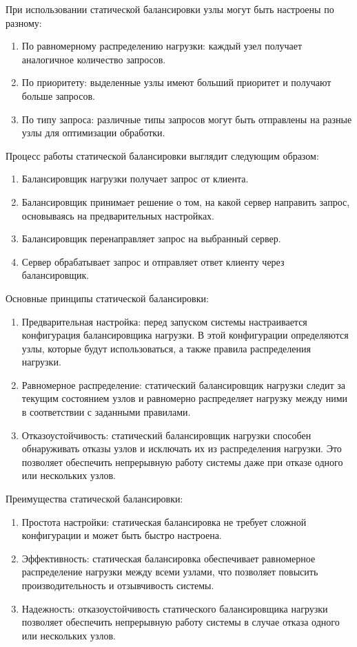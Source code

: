 При использовании статической балансировки узлы могут быть настроены по разному:
\begin{enumerate}[label=---]
	\item По равномерному распределению нагрузки: каждый узел получает аналогичное количество запросов.
	\item По приоритету: выделенные узлы имеют больший приоритет и получают больше запросов.
	\item По типу запроса: различные типы запросов могут быть отправлены на разные узлы для оптимизации обработки.
\end{enumerate}

Процесс работы статической балансировки выглядит следующим образом:
\begin{enumerate}[label=---]
	\item Балансировщик нагрузки получает запрос от клиента.
	\item Балансировщик принимает решение о том, на какой сервер направить запрос, основываясь на предварительных настройках.
	\item Балансировщик перенаправляет запрос на выбранный сервер.
	\item Сервер обрабатывает запрос и отправляет ответ клиенту через балансировщик.
\end{enumerate}

Основные принципы статической балансировки:
\begin{enumerate}[label=---]
	\item Предварительная настройка: перед запуском системы настраивается конфигурация балансировщика нагрузки. В этой конфигурации определяются узлы, которые будут использоваться, а также правила распределения нагрузки.
	\item Равномерное распределение: статический балансировщик нагрузки следит за текущим состоянием узлов и равномерно распределяет нагрузку между ними в соответствии с заданными правилами.
	\item Отказоустойчивость: статический балансировщик нагрузки способен обнаруживать отказы узлов и исключать их из распределения нагрузки. Это позволяет обеспечить непрерывную работу системы даже при отказе одного или нескольких узлов.
\end{enumerate}

Преимущества статической балансировки:
\begin{enumerate}[label=---]
	\item Простота настройки: статическая балансировка не требует сложной конфигурации и может быть быстро настроена.
	\item Эффективность: статическая балансировка обеспечивает равномерное распределение нагрузки между всеми узлами, что позволяет повысить производительность и отзывчивость системы.
	\item Надежность: отказоустойчивость статического балансировщика нагрузки позволяет обеспечить непрерывную работу системы в случае отказа одного или нескольких узлов.
\end{enumerate}

